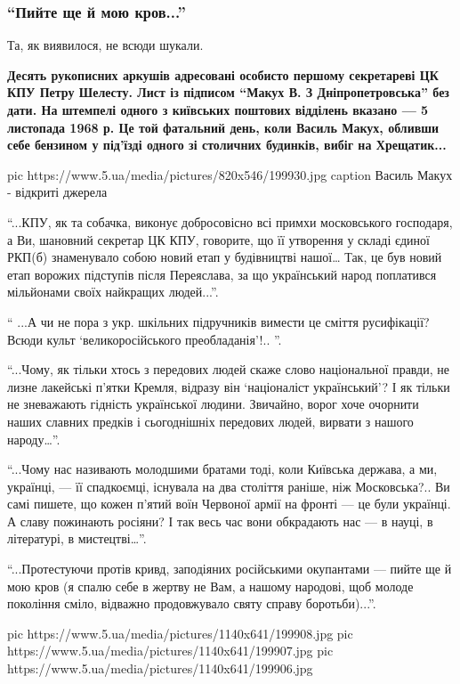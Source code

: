 \subsubsection{\enquote{Пийте ще й мою кров...}}

Та, як виявилося, не всюди шукали.

{\bfseries
Десять рукописних аркушів адресовані особисто першому секретареві ЦК КПУ
Петру Шелесту. Лист із підписом \enquote{Макух В. З Дніпропетровська} без дати.
На штемпелі одного з київських поштових відділень вказано --- 5 листопада
1968 р. Це той фатальний день, коли Василь Макух, обливши себе бензином
у під'їзді одного зі столичних будинків, вибіг на Хрещатик...
}

\ifcmt
pic https://www.5.ua/media/pictures/820x546/199930.jpg
caption Василь Макух - відкриті джерела
\fi


\enquote{...КПУ, як та собачка, виконує добросовісно всі примхи московського
господаря, а Ви, шановний секретар ЦК КПУ, говорите, що її утворення у
складі єдиної РКП(б) знаменувало собою новий етап у будівництві нашої…
Так, це був новий етап ворожих підступів після Переяслава, за що
український народ поплатився мільйонами своїх найкращих людей...}.

\enquote{
...А чи не пора з укр. шкільних підручників вимести це сміття
русифікації? Всюди культ \enquote{великоросійського преобладанія}!..
}.

\enquote{...Чому, як тільки хтось з передових людей скаже слово національної
правди, не лизне лакейські п'ятки Кремля, відразу він 
\enquote{націоналіст український}? 
І як тільки не зневажають гідність української людини.
Звичайно, ворог хоче очорнити наших славних предків і сьогоднішніх
передових людей, вирвати з нашого народу…}.

\enquote{...Чому нас називають молодшими братами тоді, коли Київська держава, а
ми, українці, --- її спадкоємці, існувала на два століття раніше, ніж
Московська?.. Ви самі пишете, що кожен п'ятий воїн Червоної армії на
фронті --- це були українці. А славу пожинають росіяни? І так весь час вони
обкрадають нас --- в науці, в літературі, в мистецтві…}.

\enquote{...Протестуючи протів кривд, заподіяних російськими окупантами --- пийте ще
й мою кров (я спалю себе в жертву не Вам, а нашому народові, щоб молоде
покоління сміло, відважно продовжувало святу справу боротьби)...}.

\ifcmt
pic https://www.5.ua/media/pictures/1140x641/199908.jpg
pic https://www.5.ua/media/pictures/1140x641/199907.jpg
pic https://www.5.ua/media/pictures/1140x641/199906.jpg
\fi

